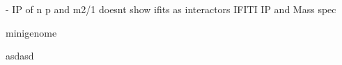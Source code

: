 \cite{Oliveira2013HumanCells} - IP of n p and m2/1 doesnt show ifits as interactors
IFITI IP and Mass spec

minigenome

asdasd




